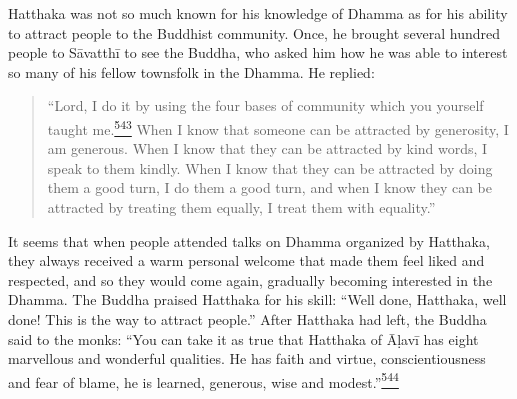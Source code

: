 Hatthaka was not so much known for his knowledge of Dhamma as for his
ability to attract people to the Buddhist community. Once, he brought
several hundred people to Sāvatthī to see the Buddha, who asked him how
he was able to interest so many of his fellow townsfolk in the Dhamma.
He replied:

\begin{quote}
``Lord, I do it by using the four bases of community which you yourself
taught
me.\label{footprints_split_014.html_fnref543}\hyperref[footprints_split_025.htmlux5cux23fn543]{\textsuperscript{543}}
When I know that someone can be attracted by generosity, I am generous.
When I know that they can be attracted by kind words, I speak to them
kindly. When I know that they can be attracted by doing them a good
turn, I do them a good turn, and when I know they can be attracted by
treating them equally, I treat them with equality.''
\end{quote}

It seems that when people attended talks on Dhamma organized by
Hatthaka, they always received a warm personal welcome that made them
feel liked and respected, and so they would come again, gradually
becoming interested in the Dhamma. The Buddha praised Hatthaka for his
skill: ``Well done, Hatthaka, well done! This is the way to attract
people.'' After Hatthaka had left, the Buddha said to the monks: ``You
can take it as true that Hatthaka of Āḷavī has eight marvellous and
wonderful qualities. He has faith and virtue, conscientiousness and fear
of blame, he is learned, generous, wise and
modest.''\label{footprints_split_014.html_fnref544}\hyperref[footprints_split_025.htmlux5cux23fn544]{\textsuperscript{544}}

